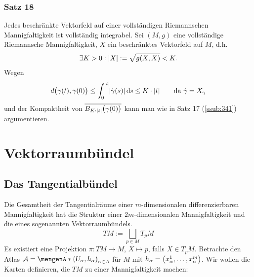\subsubsection{Satz 18} %
\label{ssub:342}
Jedes beschränkte Vektorfeld auf einer vollständigen Riemannschen Mannigfaltigkeit ist vollständig integrabel.
Sei $(M,g)$ eine vollständige Riemannsche Mannigfaltigkeit, $X$ ein beschränktes Vektorfeld auf $M$, d.h. 
\[
	\exists K > 0 : \abs*{X} := \sqrt{g(X,X)} < K.   
\]
Wegen
\begin{align*}
	d \enbrace[\big]{\gamma(t), \gamma(0)} \le \int_{0} ^{\abs*{t}} \!  \abs*{\dot{\gamma}(s)}  \, \mathd s \le K \cdot \abs*{t} \tag*{da $\dot{\gamma} = X_\gamma$}
\end{align*}
und der Kompaktheit von $\overline{B_{K \cdot \abs*{t}} \enbrace[\big]{\gamma(0)} } $ kann man wie in Satz 17 (\ref{ssub:341}) argumentieren. \bewende
\newpage

\section{Vektorraumbündel} %
\label{sec:4}

\subsection{Das Tangentialbündel} %
\label{sub:41}
Die Gesamtheit der Tangentialräume einer $m$-dimensionalen differenzierbaren Mannigfaltigkeit hat die Struktur einer $2m$-dimensionalen Mannigfaltigkeit und die eines
sogenannten Vektorraumbündels.
\[
	TM := \bigsqcup_{p \in M} T_pM
\]
Es existiert eine Projektion $\pi : T M  \to M $, $X \mapsto p$, falls $X \in T_pM$. Betrachte den Atlas $\mathcal{A} = \set{(U_\alpha, h_\alpha)}_{\alpha \in A} $ für $M$ mit 
$h_\alpha = \enbrace*{x^1_\alpha, \ldots , x^m_\alpha}$. Wir wollen die Karten definieren, die $T M$ zu einer Mannigfaltigkeit machen:

